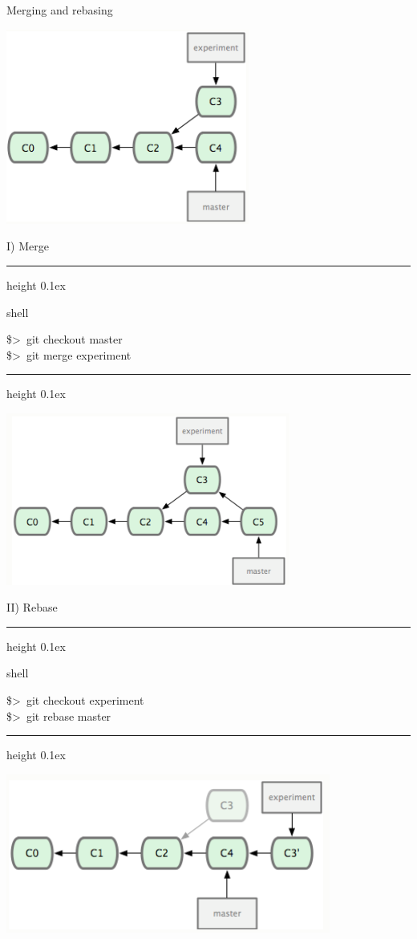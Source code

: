 \documentclass[hyperref={colorlinks}]{beamer}
\newenvironment{shell}{%
\footnotesize\flushleft\hrule height 0.1ex
\tt\begin{beamercolorbox}[sep=1ex,left]{shell}%
}{%
\end{beamercolorbox}
\hrule height 0.1ex
\endflushleft\par
}
\newcommand*{\psone}[1][ant]{\$>~}
\begin{document}
\begin{frame}{Merging and rebasing}
\begin{center}
\includegraphics[width=0.6\textwidth]{figures/tomerge}
\end{center}
\end{frame}
\begin{frame}{I) Merge}
\begin{shell}
\psone git checkout master\\
\psone git merge experiment
\end{shell}
\begin{center}
\includegraphics[width=0.7\textwidth]{figures/merged}
\end{center}
\end{frame}
\begin{frame}{II) Rebase}
\begin{shell}
\psone git checkout experiment\\
\psone git rebase master
\end{shell}
\begin{center}
\includegraphics[width=0.8\textwidth]{figures/rebase1}
\end{center}
\end{frame}
\end{document}
